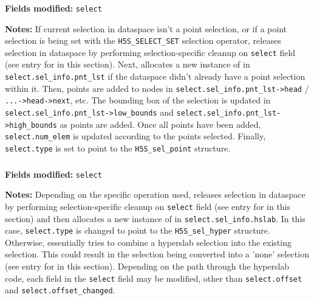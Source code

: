 \documentclass[../HDF5_RFC.tex]{subfiles}
\begin{document}
\subsubsection{}

\textbf{Fields modified:} \texttt{select}

\textbf{Notes:} If current selection in dataspace isn't a point selection, or if a point selection
is being set with the \texttt{H5S\_SELECT\_SET} selection operator, releases selection in dataspace
by performing selection-specific cleanup on \texttt{select} field (see entry for
 in this section). Next, allocates a new instance of
 in \texttt{select.sel\_info.pnt\_lst} if the dataspace didn't
already have a point selection within it. Then, points are added to nodes in
\texttt{select.sel\_info.pnt\_lst->head} / \\
\texttt{...->head->next}, etc. The bounding box of the selection is updated in \\
\texttt{select.sel\_info.pnt\_lst->low\_bounds} and \texttt{select.sel\_info.pnt\_lst->high\_bounds}
as points are added. Once all points have been added, \texttt{select.num\_elem} is updated according to
the points selected. Finally, \texttt{select.type} is set to point to the \texttt{H5S\_sel\_point}
structure.

\subsubsection{}

\textbf{Fields modified:} \texttt{select}

\textbf{Notes:} Depending on the specific operation used, releases selection in dataspace by performing
selection-specific cleanup on \texttt{select} field (see entry for  in
this section) and then allocates a new instance of  in
\texttt{select.sel\_info.hslab}. In this case, \texttt{select.type} is changed to point to the
\texttt{H5S\_sel\_hyper} structure. Otherwise, essentially tries to combine a hyperslab selection into
the existing selection. This could result in the selection being converted into a 'none' selection
(see entry for  in this section). Depending on the path through
the hyperslab code, each field in the \texttt{select} field may be modified, other than
\texttt{select.offset} and \texttt{select.offset\_changed}.
\end{document}
